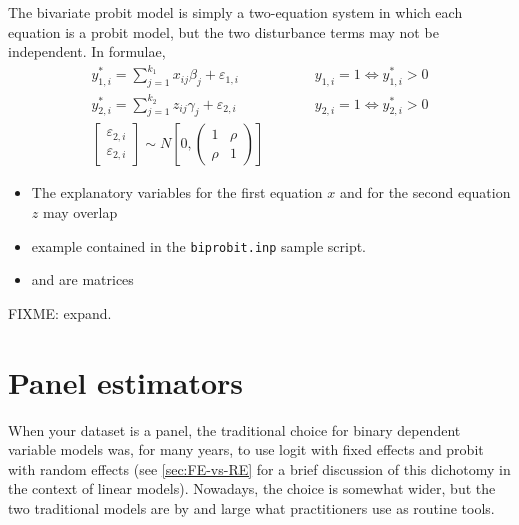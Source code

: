 The bivariate probit model is simply a two-equation system in which
each equation is a probit model, but the two disturbance terms may not
be independent. In formulae,
\begin{eqnarray}
  y^*_{1,i} = \sum_{j=1}^{k_1} x_{ij} \beta_j + \varepsilon_{1,i}  & \qquad &
  y_{1,i}=1  \Longleftrightarrow y^*_{1,i}>0 \\
  y^*_{2,i} = \sum_{j=1}^{k_2} z_{ij} \gamma_j + \varepsilon_{2,i} & \qquad &
  y_{2,i}=1  \Longleftrightarrow y^*_{2,i}>0 \\
  \left[ \begin{array}{c}
      \varepsilon_{2,i} \\ \varepsilon_{2,i}
    \end{array} \right] \sim 
  N \left[ 0, \left( \begin{array}{cc}
      1 & \rho \\ \rho & 1
    \end{array} \right) \right] 
\end{eqnarray}

\begin{itemize}
\item The explanatory variables for the first equation $x$ and for the
  second equation $z$ may overlap
\item example contained in the \texttt{biprobit.inp} sample script.
\item {} and  are matrices
\end{itemize}

FIXME: expand.


\section{Panel estimators}
\label{sec:REprobit}

When your dataset is a panel, the traditional choice for binary
dependent variable models was, for many years, to use logit with fixed
effects and probit with random effects (see \ref{sec:FE-vs-RE} for a
brief discussion of this dichotomy in the context of linear
models). Nowadays, the choice is somewhat wider, but the two
traditional models are by and large what practitioners use as routine
tools.

